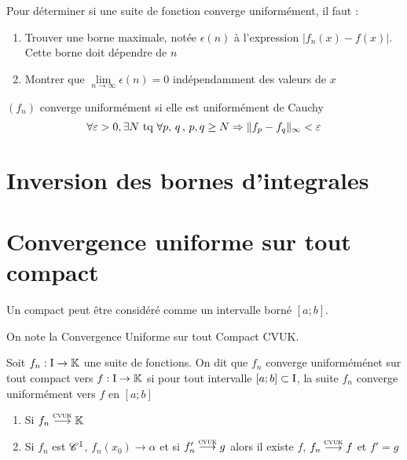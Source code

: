 \begin{note}
Pour déterminer si une suite de fonction converge uniformément, il faut :
\begin{enumerate}
	\item Trouver une borne maximale, notée $\epsilon(n)$ à l'expression $|f_n(x)-f(x)|$. Cette borne doit dépendre de $n$
    \item Montrer que $\lim\limits_{n\to\infty}\epsilon(n) = 0$ indépendamment des valeurs de $x$
\end{enumerate}
\end{note}

\begin{prop}
$(f_n)$ converge uniformément si elle est uniformément de Cauchy
$$\forall\varepsilon>0,\exists N \text{~tq~} \forall p,\,q\,,\,p,q\geq N \Rightarrow \|f_p-f_q\|_\infty < \varepsilon$$
\end{prop}

\section{Inversion des bornes d'integrales}
\section{Convergence uniforme sur tout compact}
\begin{defi}[Approximation]
Un compact peut être considéré comme un intervalle borné $[a;b]$.
\end{defi}
\begin{nota}
On note la Convergence Uniforme sur tout Compact CVUK.
\end{nota}

\begin{defi}
Soit $f_n:\text{I}\to\mathbb{K}$ une suite de fonctions. On dit que $f_n$ converge uniforméménet sur tout compact vers $f:\text{I}\to\mathbb{K}$ si pour tout intervalle $[a;b]\subset\text{I}$, la suite $f_n$ converge uniformément vers $f$ en $[a;b]$
\end{defi}
\begin{prop}
	\begin{enumerate}
		\item Si $f_n\overset{\textsc{cvuk}}{\longrightarrow}\mathbb{K}$
		\item Si $f_n$ est $\mathscr{C}^1$, $f_n(x_0)\to\alpha$ et si $f'_n\overset{\textsc{cvuk}}{\longrightarrow} g$ alors il existe $f$, $f_n\overset{\textsc{cvuk}}{\longrightarrow} f$ et $f'=g$
	\end{enumerate}
\end{prop}

